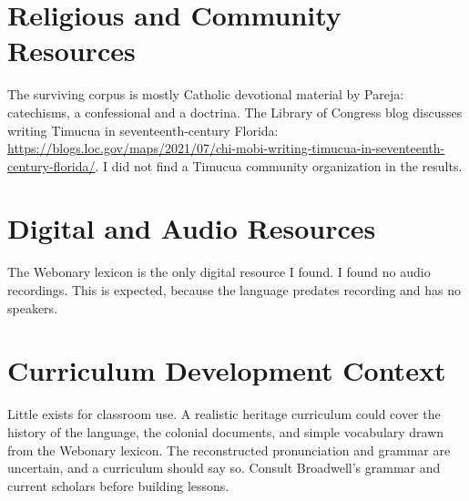 \documentclass[12pt]{article}
\begin{document}
\section{Religious and Community Resources}
The surviving corpus is mostly Catholic devotional material by Pareja: catechisms, a confessional and a doctrina. The Library of Congress blog discusses writing Timucua in seventeenth-century Florida: \url{https://blogs.loc.gov/maps/2021/07/chi-mobi-writing-timucua-in-seventeenth-century-florida/}. I did not find a Timucua community organization in the results.

\section{Digital and Audio Resources}
The Webonary lexicon is the only digital resource I found. I found no audio recordings. This is expected, because the language predates recording and has no speakers.

\section{Curriculum Development Context}
Little exists for classroom use. A realistic heritage curriculum could cover the history of the language, the colonial documents, and simple vocabulary drawn from the Webonary lexicon. The reconstructed pronunciation and grammar are uncertain, and a curriculum should say so. Consult Broadwell's grammar and current scholars before building lessons.
\end{document}
